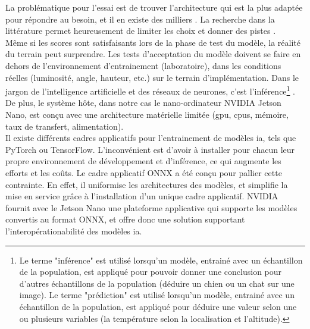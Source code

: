 \begin{comment}
Par exemple l'architecture "VGG" prend 2-3 semaines d'entrainement \parencite{simonyan_very_2015} avec 4 \acrshort{gpu} Titan Black (NVIDIA), coutant 1 200 \$US (Amazon.com) chacun (pour un total de 4 800\$US, et cela juste pour les \acrshort{gpu}s, qui ne sont qu'un des éléments de l'infrastructure nécessaire). Étant donné que de multiples tentatives sont nécessaires (cycles essai-erreur), la stratégie est d'entrainer plusieurs modèles en parallèle afin d'accélérer le développement, ce qui implique un cout élevé en infrastructure.
\end{comment}
La problématique pour l'essai est de trouver l'architecture qui est la plus adaptée pour répondre au besoin, et il en existe des milliers \parencite{koh_model_2018}. La recherche dans la littérature permet heureusement de limiter les choix et donner des pistes \parencite{zheng_real-time_2020, nguyen_mavnet_2019, nvidia_jetson_2019-1}. 
\vspace{\baselineskip}
\\
\noindent Même si les scores sont satisfaisants lors de la phase de test du modèle, la réalité du terrain peut surprendre. Les tests d'acceptation du modèle doivent se faire en dehors de l'environnement d'entrainement (laboratoire), dans les conditions réelles (luminosité, angle, hauteur, etc.) sur le terrain d'implémentation. Dans le jargon de l'intelligence artificielle et des réseaux de neurones, c'est l'inférence\footnote{Le terme "inférence" est utilisé lorsqu'un modèle, entrainé avec un échantillon de la population, est appliqué pour pouvoir donner une conclusion pour d'autres échantillons de la population (déduire un chien ou un chat sur une image). Le terme "prédiction" est utilisé lorsqu'un modèle, entrainé avec un échantillon de la population, est appliqué pour déduire une valeur selon une ou plusieurs variables (la température selon la localisation et l'altitude).} \parencite{copel_whats_2016, nvidia_jetson_2019-1}. De plus, le système hôte, dans notre cas le nano-ordinateur NVIDIA Jetson Nano, est conçu avec une architecture matérielle limitée (\acrshort{gpu}, \acrshort{cpu}s, mémoire, taux de transfert, alimentation). 
\vspace{\baselineskip}
\\
\noindent Il existe différents cadres applicatifs pour l'entrainement de modèles \acrshort{ia}, tels que PyTorch ou TensorFlow. L'inconvénient est d'avoir à installer pour chacun leur propre environnement de développement et d'inférence, ce qui augmente les efforts et les coûts. Le cadre applicatif ONNX a été conçu pour pallier cette contrainte. En effet, il uniformise les architectures des modèles, et simplifie la mise en service grâce à l'installation d'un unique cadre applicatif. NVIDIA fournit avec le Jetson Nano une plateforme applicative qui supporte les modèles convertis au format ONNX, et offre donc une solution supportant l'interopérationabilité des modèles \acrshort{ia}. 